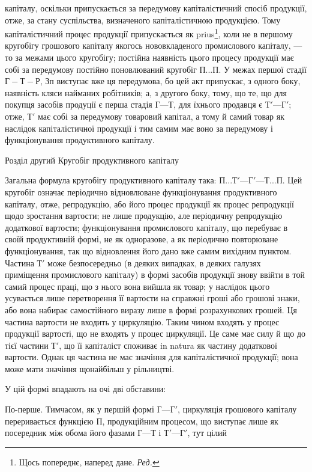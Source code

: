 \parcont{}  %
капіталу, оскільки припускається за передумову капіталістичний спосіб
продукції, отже, за стану суспільства, визначеного капіталістичною продукцією.
Тому капіталістичний процес продукції припускається як prius\footnote*{
Щось попереднє, наперед дане. \emph{Ред.}
},
коли не в першому кругобігу грошового капіталу якогось нововкладеного
промислового капіталу, — то за межами цього кругобігу; постійна наявність
цього процесу продукції має собі за передумову постійно поновлюваний кругобіг $П... П$. У межах першої
стадії $Г-Т-Р$, Зп виступає вже ця передумова, бо цей акт припускає, з одного боку, наявність кляси
найманих робітників; а, з другого боку, тому, що те, що для покупця
засобів продуції є перша стадія $Г — Т$, для їхнього продавця є $Т' — Г'$;
отже, $Т'$ має собі за передумову товаровий капітал, а тому й самий
товар як наслідок капіталістичної продукції і тим самим має воно за
передумову і функціонування продуктивного капіталу.

Розділ другий
Кругобіг продуктивного капіталу

Загальна формула кругобігу продуктивного капіталу така: $П... Т' —
Г' — Т... П$. Цей кругобіг означає періодично відновлюване функціонування
продуктивного капіталу, отже, репродукцію, або його процес
продукції як процес репродукції щодо зростання вартости; не лише
продукцію, але періодичну репродукцію додаткової вартости; функціонування
промислового капіталу, що перебуває в своїй продуктивній формі,
не як одноразове, а як періодично повторюване функціонування, так що
відновлення його дано вже самим вихідним пунктом. Частина $Т'$ може
безпосередньо (в деяких випадках, в деяких галузях приміщення промислового
капіталу) в формі засобів продукції знову ввійти в той самий
процес праці, що з нього вона вийшла як товар; у наслідок цього усувається
лише перетворення її вартости на справжні гроші або грошові
знаки, або вона набирає самостійного виразу лише в формі розрахункових
грошей. Ця частина вартости не входить у циркуляцію. Таким чином
входять у процес продукції вартості, що не входять у процес циркуляції.
Це саме має силу й що до тієї частини $Т'$, що її капіталіст споживає
in natura як частину додаткової вартости. Однак ця частина не має значіння
для капіталістичної продукції; вона може мати значіння щонайбільш
у рільництві.

У цій формі впадають на очі дві обставини:

По-перше. Тимчасом, як у першій формі $Г — Г'$, циркуляція грошового
капіталу переривається функцією П, продукційним процесом, що виступає
лише як посередник між обома його фазами $Г — Т$ і $Т' — Г'$, тут цілий
\parbreak{}  %
